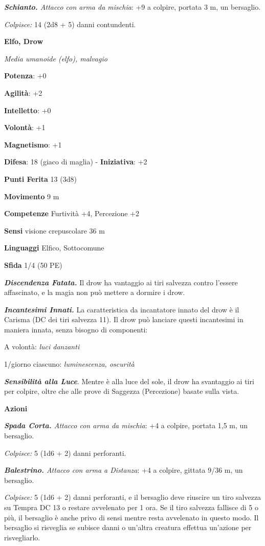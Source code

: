 \begin{multicols}{2}
\emph{\textbf{Schianto.} Attacco con arma da mischia}: +9 a colpire,
portata 3 m, un bersaglio.

\emph{Colpisce:} 14 (2d8 + 5) danni contundenti.

\textbf{Elfo, Drow}

\emph{Media umanoide (elfo), malvagio}

\textbf{Potenza}: +0

\textbf{Agilità}: +2

\textbf{Intelletto}: +0

\textbf{Volontà}: +1

\textbf{Magnetismo}: +1

\textbf{Difesa}: 18 (giaco di maglia) - \textbf{Iniziativa}: +2

\textbf{Punti Ferita} 13 (3d8)

\textbf{Movimento} 9 m

\textbf{Competenze} Furtività +4, Percezione +2

\textbf{Sensi} visione crepuscolare 36 m

\textbf{Linguaggi} Elfico, Sottocomune

\textbf{Sfida} 1/4 (50 PE)

\emph{\textbf{Discendenza Fatata.}} Il drow ha vantaggio ai tiri
salvezza contro l'essere affascinato, e la magia non può mettere a
dormire i drow.

\emph{\textbf{Incantesimi Innati.}} La caratteristica da incantatore
innato del drow è il Carisma (DC dei tiri salvezza 11). Il drow può
lanciare questi incantesimi in maniera innata, senza bisogno di
componenti:

A volontà: \emph{luci danzanti}

1/giorno ciascuno: \emph{luminescenza, oscurità}

\emph{\textbf{Sensibilità alla Luce}}. Mentre è alla luce del sole, il
drow ha svantaggio ai tiri per colpire, oltre che alle prove di Saggezza
(Percezione) basate sulla vista.

\textbf{Azioni}

\emph{\textbf{Spada Corta.} Attacco con arma da mischia}: +4 a colpire,
portata 1,5 m, un bersaglio.

\emph{Colpisce:} 5 (1d6 + 2) danni perforanti.

\emph{\textbf{Balestrino.} Attacco con arma a Distanza}: +4 a colpire,
gittata 9/36 m, un bersaglio.

\emph{Colpisce:} 5 (1d6 + 2) danni perforanti, e il bersaglio deve
riuscire un tiro salvezza su Tempra DC 13 o restare avvelenato per
1 ora. Se il tiro salvezza fallisce di 5 o più, il bersaglio è anche
privo di sensi mentre resta avvelenato in questo modo. Il bersaglio si
risveglia se subisce danni o un'altra creatura effettua un'azione per
risvegliarlo.




\end{multicols}
